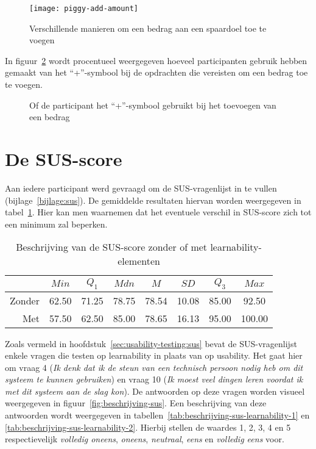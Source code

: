 \begin{figure}[h!]
    \centering
    \texttt{[image: piggy-add-amount]}
    \caption{Verschillende manieren om een bedrag aan een spaardoel toe te voegen}
    \label{fig:piggy:add-amount}
\end{figure}

In figuur~\ref{fig:beschrijving-plus} wordt procentueel weergegeven hoeveel participanten gebruik hebben gemaakt van het ``+''-symbool bij de opdrachten die vereisten om een bedrag toe te voegen.

\begin{figure}[h]
    \centering
    \qquad
    \caption{Of de participant het ``+''-symbool gebruikt bij het toevoegen van een bedrag}
    \label{fig:beschrijving-plus}
\end{figure}

\section{De SUS-score}
\label{sec:sus}

Aan iedere participant werd gevraagd om de SUS-vragenlijst in te vullen (bijlage~\ref{bijlage:sus}). De gemiddelde resultaten hiervan worden weergegeven in tabel~\ref{tab:beschrijving-sus}. Hier kan men waarnemen dat het eventuele verschil in SUS-score zich tot een minimum zal beperken.

\begin{table}[h]
	\centering
	\begin{tabular}{r|ccccccc}
		& $Min$ & $Q_1$ & $Mdn$ & $M$ & $SD$ & $Q_3$ & $Max$ \\ \hline
		Zonder & 62.50 & 71.25 & 78.75 & 78.54 & 10.08 & 85.00 & 92.50 \\
		Met & 57.50 & 62.50 & 85.00 & 78.65 & 16.13 & 95.00 & 100.00
	\end{tabular}
	\caption{Beschrijving van de SUS-score zonder of met learnability-elementen}
	\label{tab:beschrijving-sus}
\end{table}

Zoals vermeld in hoofdstuk~\ref{sec:usability-testing:sus} bevat de SUS-vragenlijst enkele vragen die testen op learnability in plaats van op usability. Het gaat hier om vraag 4 (\textit{Ik denk dat ik de steun van een technisch persoon nodig heb om dit systeem te kunnen gebruiken}) en vraag 10 (\textit{Ik moest veel dingen leren voordat ik met dit systeem aan de slag kon}). De antwoorden op deze vragen worden visueel weergegeven in figuur~\ref{fig:beschrijving-sus}. Een beschrijving van deze antwoorden wordt weergegeven in tabellen~\ref{tab:beschrijving-sus-learnability-1} en \ref{tab:beschrijving-sus-learnability-2}. Hierbij stellen de waardes 1, 2, 3, 4 en 5 respectievelijk \textit{volledig oneens}, \textit{oneens}, \textit{neutraal}, \textit{eens} en \textit{volledig eens} voor.

